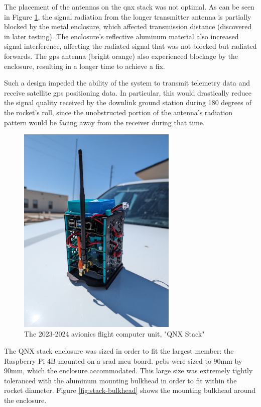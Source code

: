 The placement of the antennas on the \gls{qnx} stack was not optimal. As can be seen in Figure
\ref{fig:preflight-stack}, the signal radiation from the longer transmitter antenna is partially blocked by the metal
enclosure, which affected transmission distance (discovered in later testing). The enclosure's reflective aluminum
material also increased signal interference, affecting the radiated signal that was not blocked but radiated forwards.
The \gls{gps} antenna (bright orange) also experienced blockage by the enclosure, resulting in a longer time to achieve
a fix.

Such a design impeded the ability of the system to transmit telemetry data and receive satellite \gls{gps} positioning
data. In particular, this would drastically reduce the signal quality received by the downlink ground station during
180 degrees of the rocket's roll, since the unobstructed portion of the antenna's radiation pattern would be facing
away from the receiver during that time.

\begin{figure}[H]
    \center
    \includegraphics[width=3in]{assets/images/stack.jpg}
    \caption{The 2023-2024 avionics flight computer unit, "QNX Stack"}
    \label{fig:preflight-stack}
\end{figure}

The QNX stack enclosure was sized in order to fit the largest member: the Raspberry Pi 4B mounted on a \gls{srad}
\gls{mcu} board. \Glspl{pcb} were sized to 90mm by 90mm, which the enclosure accommodated. This large size was
extremely tightly toleranced with the aluminum mounting bulkhead in order to fit within the rocket diameter. Figure
\ref{fig:stack-bulkhead} shows the mounting bulkhead around the enclosure.

